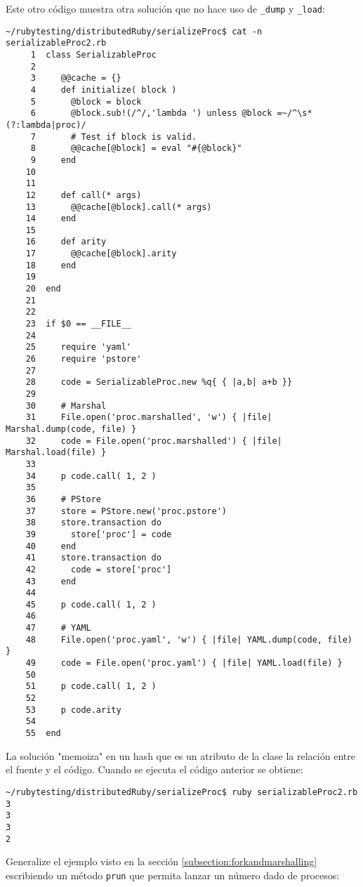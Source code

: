 Este otro código muestra otra solución que no hace uso de \verb|_dump| y \verb|_load|:
\begin{verbatim}
~/rubytesting/distributedRuby/serializeProc$ cat -n serializableProc2.rb 
     1  class SerializableProc
     2  
     3     @@cache = {}
     4     def initialize( block )
     5       @block = block
     6       @block.sub!(/^/,'lambda ') unless @block =~/^\s*(?:lambda|proc)/
     7       # Test if block is valid.
     8       @@cache[@block] = eval "#{@block}"
     9     end
    10  
    11  
    12     def call(* args)
    13       @@cache[@block].call(* args)
    14     end
    15  
    16     def arity
    17       @@cache[@block].arity
    18     end
    19  
    20  end
    21  
    22  
    23  if $0 == __FILE__
    24  
    25     require 'yaml'
    26     require 'pstore'
    27  
    28     code = SerializableProc.new %q{ { |a,b| a+b }}
    29  
    30     # Marshal
    31     File.open('proc.marshalled', 'w') { |file| Marshal.dump(code, file) }
    32     code = File.open('proc.marshalled') { |file| Marshal.load(file) }
    33  
    34     p code.call( 1, 2 )
    35  
    36     # PStore
    37     store = PStore.new('proc.pstore')
    38     store.transaction do
    39       store['proc'] = code
    40     end
    41     store.transaction do
    42       code = store['proc']
    43     end
    44  
    45     p code.call( 1, 2 )
    46  
    47     # YAML
    48     File.open('proc.yaml', 'w') { |file| YAML.dump(code, file) }
    49     code = File.open('proc.yaml') { |file| YAML.load(file) }
    50  
    51     p code.call( 1, 2 )
    52  
    53     p code.arity
    54  
    55  end
\end{verbatim}
La solución "memoiza" en un hash que es un atributo de la clase la relación entre el fuente y el código.
Cuando se ejecuta el código anterior se obtiene:
\begin{verbatim}
~/rubytesting/distributedRuby/serializeProc$ ruby serializableProc2.rb 
3
3
3
2
\end{verbatim}

Generalize el ejemplo visto en la sección \ref{subsection:forkandmarshalling}
escribiendo un método \verb|prun| que permita lanzar un número dado de procesos:


